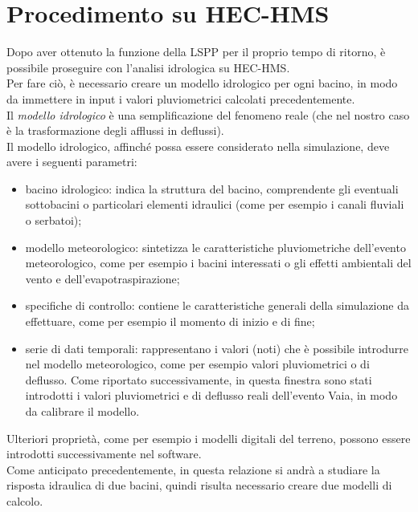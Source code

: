 \section{Procedimento su HEC-HMS}
Dopo aver ottenuto la funzione della LSPP per il proprio tempo di ritorno, è possibile proseguire con l'analisi idrologica su HEC-HMS.\\
Per fare ciò, è necessario creare un modello idrologico per ogni bacino, in modo da immettere in input i valori pluviometrici calcolati precedentemente.\\
Il \textit{modello idrologico} è una semplificazione del fenomeno reale (che nel nostro caso è la trasformazione degli afflussi in deflussi).\\
Il modello idrologico, affinché possa essere considerato nella simulazione, deve avere i seguenti parametri:
\begin{itemize}
    \item bacino idrologico: indica la struttura del bacino, comprendente gli eventuali sottobacini o particolari elementi idraulici (come per esempio i canali fluviali o serbatoi);
    \item modello meteorologico: sintetizza le caratteristiche pluviometriche dell'evento meteorologico, come per esempio i bacini interessati o gli effetti ambientali del vento e dell'evapotraspirazione;
    \item specifiche di controllo: contiene le caratteristiche generali della simulazione da effettuare, come per esempio il momento di inizio e di fine;
    \item serie di dati temporali: rappresentano i valori (noti) che è possibile introdurre nel modello meteorologico, come per esempio valori pluviometrici o di deflusso. Come riportato successivamente, in questa finestra sono stati introdotti i valori pluviometrici e di deflusso reali dell'evento Vaia, in modo da calibrare il modello.
\end{itemize}
 Ulteriori proprietà, come per esempio i modelli digitali del terreno, possono essere introdotti successivamente nel software.\\
 Come anticipato precedentemente, in questa relazione si andrà a studiare la risposta idraulica di due bacini, quindi risulta necessario creare due modelli di calcolo.